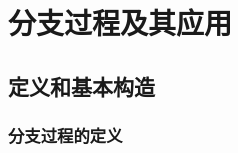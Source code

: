\documentclass[main]{subfiles}
\begin{document}
\section{分支过程及其应用}%
\subsection{定义和基本构造}
\subsubsection{分支过程的定义}
\ifSubfilesClassLoaded{%
  \printindex}{%
}
\end{document}
